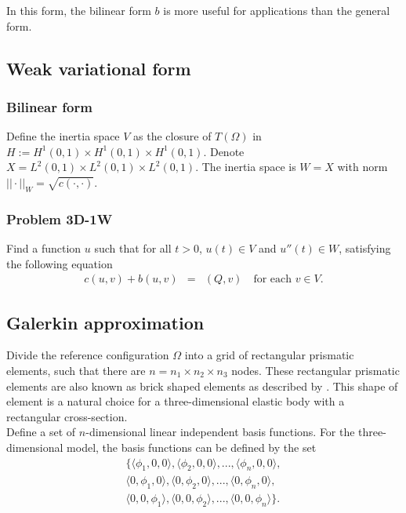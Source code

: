 \documentclass[../../main.tex]{subfiles}
\begin{document}
In this form, the bilinear form $b$ is more useful for applications than the general form.

\subsection{Weak variational form}

\subsubsection{Bilinear form}
Define the inertia space $V$ as the closure of $T(\Omega)$ in $H := H^1(0,1)\times H^1(0,1)\times H^1(0,1)$. Denote $X = L^2(0,1)\times L^2(0,1)\times L^2(0,1)$. The inertia space is $W  = X$ with norm $||\cdot||_W = \sqrt{c(\cdot,\cdot)}$.

\subsubsection{Problem 3D-1W}
Find a function $u$ such that for all $t>0$, $u(t) \in V$ and $u''(t) \in W$, satisfying the following equation
\begin{eqnarray}
	c(u,v) + b(u,v) & = & (Q,v) \ \ \ \textrm{ for each } v \in V.
\end{eqnarray}

\subsection{Galerkin approximation}
Divide the reference configuration $\Omega$ into a grid of rectangular prismatic elements, such that there are $n = n_1 \times n_2 \times n_3$ nodes. These rectangular prismatic elements are also known as brick shaped elements as described by \cite{Wu06}. This shape of element is a natural choice for a three-dimensional elastic body with a rectangular cross-section.\\

Define a set of $n$-dimensional linear independent basis functions. For the three-dimensional model, the basis functions can be defined by the set
\begin{eqnarray*}
 \{\langle\phi_1, 0 , 0\rangle, \langle\phi_2, 0, 0\rangle,...,\langle\phi_{n}, 0, 0 \rangle,\\
	\langle 0,\phi_1 ,0 \rangle,\langle 0 ,\phi_2,0\rangle,...,\langle 0,\phi_{n},0\rangle,\\
	\langle 0,0,\phi_1 \rangle,\langle 0,0,\phi_2\rangle,...,\langle 0,0,\phi_{n}\rangle \}.
\end{eqnarray*}
\end{document}
